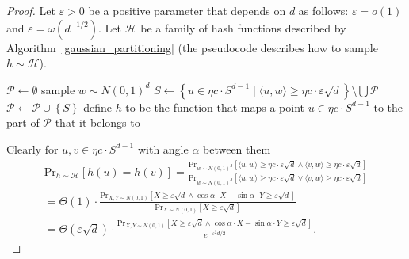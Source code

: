 \documentclass[11pt,letterpaper]{article}
\newcommand{\set}[1]{\left\{#1\right\}}
\newcommand{\eps}{\varepsilon}
\begin{document}
\begin{proof}
    Let $\eps > 0$ be a positive parameter that depends on $d$ as follows: $\eps = o(1)$ and $\eps = \omega(d^{-1/2})$.
    Let $\mathcal{H}$ be a family of hash functions described by Algorithm~\ref{gaussian_partitioning}
    (the pseudocode describes how to sample $h \sim \mathcal{H}$).
    \begin{algorithm}
        \caption{Gaussian partitioning}
        \label{gaussian_partitioning}
        \begin{algorithmic}
            \State $\mathcal{P} \gets \emptyset$
                \State sample $w \sim N(0, 1)^d$
                \State $S \gets \set{u \in \eta c \cdot S^{d-1} \mid \langle u, w \rangle \geq \eta c \cdot \eps \sqrt{d}} \setminus\bigcup \mathcal{P}$
                    \State $\mathcal{P} \gets \mathcal{P} \cup \set{S}$
                \EndIf
            \EndWhile
            \State define $h$ to be the function that maps a point $u \in \eta c \cdot S^{d-1}$ to the part of $\mathcal{P}$ that it belongs to
        \end{algorithmic}
    \end{algorithm}

    Clearly for $u, v \in \eta c \cdot S^{d-1}$ with angle $\alpha$ between them
    \begin{multline}
        \label{coll}
        \mathrm{Pr}_{h \sim \mathcal{H}}[h(u) = h(v)] = \frac{\mathrm{Pr}_{w \sim N(0, 1)^d}[\langle u, w\rangle \geq \eta c \cdot \eps \sqrt{d}
            \wedge
            \langle v, w\rangle \geq \eta c \cdot \eps \sqrt{d}]}{\mathrm{Pr}_{w \sim N(0, 1)^d}[\langle u, w\rangle \geq \eta c \cdot \eps \sqrt{d}
            \vee
            \langle v, w\rangle \geq \eta c \cdot \eps \sqrt{d}]} \\ = \Theta(1) \cdot
            \frac{\mathrm{Pr}_{X, Y \sim N(0, 1)}[X \geq \eps \sqrt{d} \wedge \cos \alpha \cdot X - \sin \alpha \cdot Y \geq \eps \sqrt{d}]}{\mathrm{Pr}_{X \sim N(0, 1)}[X \geq \eps \sqrt{d}]}\\ = \Theta(\eps \sqrt{d}) \cdot
            \frac{\mathrm{Pr}_{X, Y \sim N(0, 1)}[X \geq \eps \sqrt{d} \wedge \cos \alpha \cdot X - \sin \alpha \cdot Y \geq \eps \sqrt{d}]}{e^{-\eps^2 d / 2}}.
    \end{multline}


\end{proof}
\end{document}
